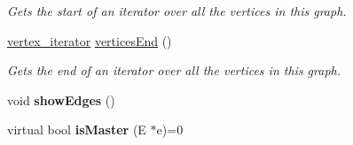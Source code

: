 \begin{DoxyCompactItemize}
\begin{DoxyCompactList}\small\item\em Gets the start of an iterator over all the vertices in this graph. \end{DoxyCompactList}\item 
\hyperlink{classrepast_1_1_graph_acee609459f11e02371ae4d8d226aafab}{vertex\-\_\-iterator} \hyperlink{classrepast_1_1_graph_acd76c847169c86e1e981100e8cf896f0}{vertices\-End} ()
\begin{DoxyCompactList}\small\item\em Gets the end of an iterator over all the vertices in this graph. \end{DoxyCompactList}\item 
\hypertarget{classrepast_1_1_graph_a2bfd1ab5fde73c290df15318746831f5}{void {\bfseries show\-Edges} ()}\label{classrepast_1_1_graph_a2bfd1ab5fde73c290df15318746831f5}

\item 
\hypertarget{classrepast_1_1_graph_a8c2f3ff6eb7d2975ed29cadcdd532b49}{virtual bool {\bfseries is\-Master} (E $\ast$e)=0}\label{classrepast_1_1_graph_a8c2f3ff6eb7d2975ed29cadcdd532b49}


\end{DoxyCompactItemize}
